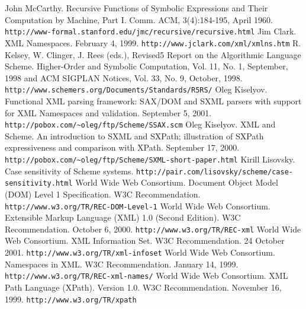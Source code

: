 \documentclass[10pt]{article}
\begin{document}
\begin{thebibliography}{}
 John McCarthy. Recursive Functions of Symbolic Expressions
and Their Computation by Machine, Part I. Comm. ACM, 3(4):184-195, April 1960. \texttt{http://www-formal.stanford.edu/jmc/recursive/recursive.html} 
 Jim Clark. XML Namespaces. February 4, 1999. \texttt{http://www.jclark.com/xml/xmlns.htm} 
 R. Kelsey, W. Clinger, J. Rees (eds.), Revised5 Report on
                      the Algorithmic Language Scheme. Higher-Order and
                      Symbolic Computation, Vol. 11, No. 1, September, 1998
                      and
                      ACM SIGPLAN Notices, Vol. 33, No. 9, October, 1998. \texttt{http://www.schemers.org/Documents/Standards/R5RS/} 
 Oleg Kiselyov. Functional XML parsing framework: SAX/DOM and
SXML parsers with support for XML Namespaces and validation. September
5, 2001. \texttt{http://pobox.com/\textasciitilde{}oleg/ftp/Scheme/SSAX.scm} 
 Oleg Kiselyov. XML and Scheme. An introduction to SXML and SXPath;
illustration of SXPath expressiveness and comparison with
XPath. September 17, 2000. \texttt{http://pobox.com/\textasciitilde{}oleg/ftp/Scheme/SXML-short-paper.html} 
 Kirill Lisovsky. Case sensitivity of Scheme systems. \texttt{http://pair.com/lisovsky/scheme/case-sensitivity.html} 
 World Wide Web Consortium. Document Object Model (DOM) Level 1
Specification. W3C Recommendation. \texttt{http://www.w3.org/TR/REC-DOM-Level-1} 
 World Wide Web Consortium. Extensible Markup Language (XML)
1.0 (Second Edition). W3C Recommendation. October 6, 2000. \texttt{http://www.w3.org/TR/REC-xml} 
 World Wide Web Consortium. XML Information Set.  W3C Recommendation. 24 October 2001. \texttt{http://www.w3.org/TR/xml-infoset} 
 World Wide Web Consortium. Namespaces in XML. W3C Recommendation. January 14, 1999. \texttt{http://www.w3.org/TR/REC-xml-names/} 
 World Wide Web Consortium. XML Path Language (XPath).
Version 1.0. W3C Recommendation. November 16, 1999. \texttt{http://www.w3.org/TR/xpath} 
\end{thebibliography}
\end{document}
